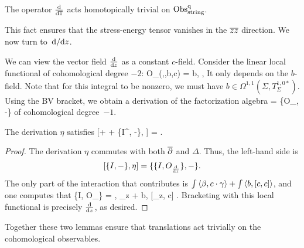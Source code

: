\begin{lem}
The operator $\frac{{\rm d}}{{\rm d} \overline{z}}$ acts homotopically trivial on ${\rm Obs}^{\rm q}_{\rm string}$. 
\end{lem}

This fact ensures that the stress-energy tensor vanishes in the $\overline{z}\overline{z}$ direction.
We now turn to~${\rm d}/{\rm d} z$.

We can view the vector field $\frac{{\rm d}}{{\rm d} z}$ as a constant $c$-field. 
Consider the linear local functional of cohomological degree $-2$:
\ben
O_{}(\beta,\gamma,b,c) = \int \<b, \>,
\een
It only depends on the $b$-field.
Note that for this integral to be nonzero, 
we must have $b \in \Omega^{1,1}(\Sigma , T_\Sigma^{1,0*})$. 
Using the BV bracket, we obtain a derivation of the factorization algebra 
\ben
\eta = \{O_{}, -\}
\een
of cohomological degree~$-1$. 


\begin{lem} 
The derivation $\eta$ satisfies 
\be\label{d/dz}
[\dbar + \hbar \Delta + \{I^\q, -\}, \eta] = .
\ee
\end{lem}
\begin{proof}
The derivation $\eta$ commutes with both $\overline{\partial}$ and $\Delta$. 
Thus, the left-hand side is 
\[
[\{I, -\}, \eta] = \{ \{I, O_{\frac{{\rm d}}{{\rm d} z}}\}, -\}.
\]
The only part of the interaction that contributes is $\int \left\langle\beta, c \cdot \gamma\right\rangle + \int \left\langle b, [c,c]\right\rangle$, and one computes that
\ben
\{I, O_{}\} = \int \<\beta, \partial_z \gamma\> + \int\<b, [\partial_z, c]\> .
\een
Bracketing with this local functional is precisely $\frac{{\rm d}}{{\rm d} z}$, as desired.
\end{proof}

Together these two lemmas ensure that translations act trivially on the cohomological observables.

